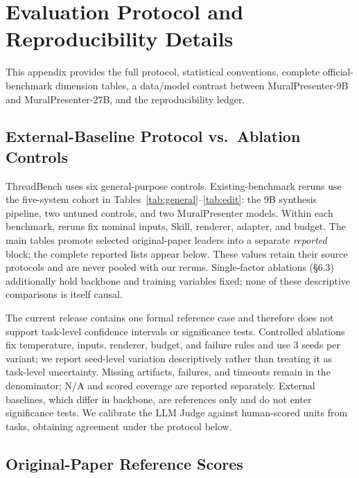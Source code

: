 \section{Evaluation Protocol and Reproducibility Details}
\label{app:protocol}
\setcounter{figure}{0}
\renewcommand{\thefigure}{A\arabic{figure}}
\renewcommand{\theHfigure}{A\arabic{figure}}

This appendix provides the full protocol, statistical conventions, complete official-benchmark dimension tables, a data/model contrast between MuralPresenter-9B and MuralPresenter-27B, and the reproducibility ledger.

\subsection{External-Baseline Protocol vs.\ Ablation Controls}

ThreadBench uses six general-purpose controls. Existing-benchmark reruns use the five-system cohort in Tables~\ref{tab:general}--\ref{tab:edit}: the 9B synthesis pipeline, two untuned controls, and two MuralPresenter models. Within each benchmark, reruns fix nominal inputs, Skill, renderer, adapter, and budget. The main tables promote selected original-paper leaders into a separate \emph{reported} block; the complete reported lists appear below. These values retain their source protocols and are never pooled with our reruns. Single-factor ablations (\S6.3) additionally hold backbone and training variables fixed; none of these descriptive comparisons is itself causal.

The current release contains one formal reference case and therefore does not support task-level confidence intervals or significance tests. Controlled ablations fix temperature, inputs, renderer, budget, and failure rules and use 3 seeds per variant; we report seed-level variation descriptively rather than treating it as task-level uncertainty. Missing artifacts, failures, and timeouts remain in the denominator; N/A and scored coverage are reported separately. External baselines, which differ in backbone, are references only and do not enter significance tests. We calibrate the LLM Judge against  human-scored units from  tasks, obtaining  agreement under the protocol below.

\subsection{Original-Paper Reference Scores}

